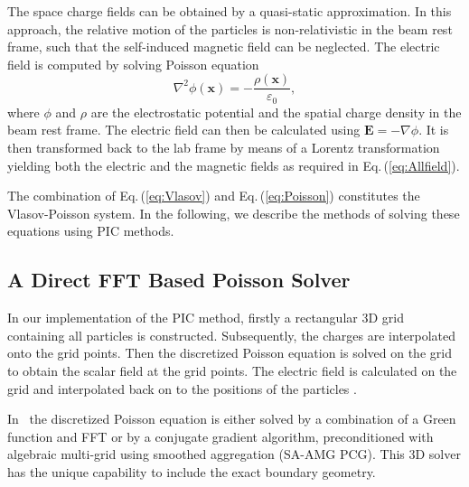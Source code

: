 \documentclass[acus]{JAC2003}
\newcommand{\bs}[1]{\mathbf #1}
\begin{document}
The space charge fields can be obtained
by a quasi-static approximation. In this approach, the relative motion of the particles is non-relativistic in the beam rest frame, such that the self-induced magnetic field 
can be neglected. The electric field is computed by solving Poisson equation
\begin{equation}\label{eq:Poisson}
  \nabla^{2} \phi(\bs{x}) = - \frac{\rho(\bs{x})}{\varepsilon_0},
\end{equation}
where $\phi$ and $\rho$ are the electrostatic potential and the spatial charge density in the beam rest frame. The electric field can then be calculated using $ \bs{E}=-\nabla\phi$.
It is then transformed back to the lab frame by means of a Lorentz transformation yielding both the electric and the magnetic fields as required in Eq.\,(\ref{eq:Allfield}).

The combination of Eq.\,(\ref{eq:Vlasov}) and Eq.\,(\ref{eq:Poisson}) constitutes the Vlasov-Poisson system. 
In the following, we describe the methods of solving these equations using PIC methods.
\subsection{A Direct FFT Based Poisson Solver}
In our implementation of the PIC method, firstly a rectangular 3D grid containing all particles is constructed.  Subsequently, the charges 
are interpolated onto the grid points. Then the discretized Poisson equation is solved on the grid to obtain the scalar field at the grid points. 
The electric field is calculated on the grid and interpolated back on to the positions of the particles .

In \opal\ the discretized Poisson equation is either solved by a combination of a Green function and FFT or by a conjugate gradient algorithm, preconditioned
with algebraic multi-grid using smoothed aggregation (SA-AMG PCG). This 3D solver has the unique capability to include the exact
boundary geometry. %
\end{document}
